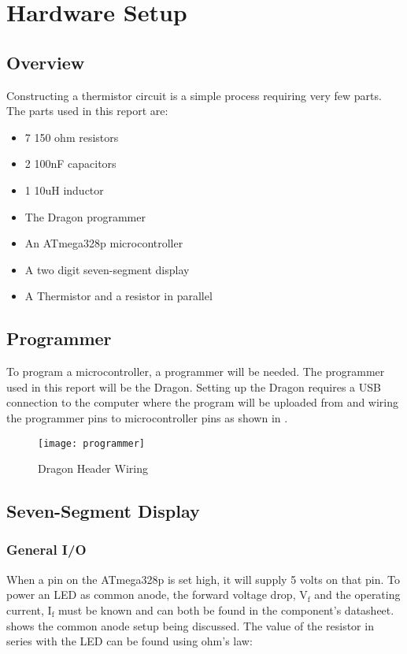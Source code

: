 \documentclass[main.tex]{subfiles}
\begin{document}
\chapter{Hardware Setup}
	\section{Overview}
	Constructing a thermistor circuit is a simple process requiring very few parts. The parts
	used in this report are:
	\begin{itemize}
		\item 7 150 ohm resistors
		\item 2 100nF capacitors
		\item 1 10uH inductor
		\item The Dragon programmer
		\item An ATmega328p microcontroller
		\item A two digit seven-segment display
		\item A Thermistor and a resistor in parallel
	\end{itemize}
	
	
	\section{Programmer}
	To program a microcontroller, a programmer will be needed. The programmer used in this report
	will be the Dragon. Setting up the Dragon requires a USB connection to the computer where
	the program will be uploaded from and wiring the programmer pins to microcontroller pins
	as shown in .
	\begin{figure}[H]
		\begin{center}
			\texttt{[image: programmer]}
		\end{center}
		\caption{Dragon Header Wiring}
		\label{fig:programmer}
	\end{figure}	


	\section{Seven-Segment Display}
		\subsection{General I/O}
		When a pin on the ATmega328p is set high, it will supply 5 volts on that pin. To power an
		LED as common anode, the forward voltage drop, V$_{\text{f}}$ and the operating current,
		I$_{\text{f}}$ must be known and can both be found in the component's datasheet. 
		shows the common anode setup being discussed. The value of the resistor in series with the
		LED can be found using ohm's law: 
		
\end{document}
